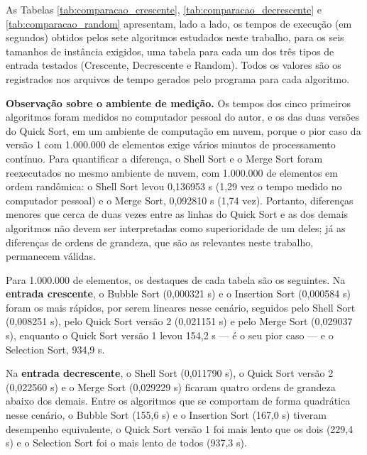 \qquad As Tabelas \ref{tab:comparacao_crescente}, \ref{tab:comparacao_decrescente}
e \ref{tab:comparacao_random} apresentam, lado a lado, os tempos de
execução (em segundos) obtidos pelos sete algoritmos estudados neste
trabalho, para os seis tamanhos de instância exigidos, uma tabela para
cada um dos três tipos de entrada testados (Crescente, Decrescente e
Random). Todos os valores são os registrados nos arquivos de tempo
gerados pelo programa para cada algoritmo.







\qquad \textbf{Observação sobre o ambiente de medição.} Os tempos dos
cinco primeiros algoritmos foram medidos no computador pessoal do
autor, e os das duas versões do Quick Sort, em um ambiente de
computação em nuvem, porque o pior caso da versão 1 com 1.000.000 de
elementos exige vários minutos de processamento contínuo. Para
quantificar a diferença, o Shell Sort e o Merge Sort foram
reexecutados no mesmo ambiente de nuvem, com 1.000.000 de elementos em
ordem randômica: o Shell Sort levou 0,136953 s (1,29 vez o tempo
medido no computador pessoal) e o Merge Sort, 0,092810 s (1,74 vez).
Portanto, diferenças menores que cerca de duas vezes entre as linhas
do Quick Sort e as dos demais algoritmos não devem ser interpretadas
como superioridade de um deles; já as diferenças de ordens de
grandeza, que são as relevantes neste trabalho, permanecem válidas.

\qquad Para 1.000.000 de elementos, os destaques de cada tabela são os
seguintes. Na \textbf{entrada crescente}, o Bubble Sort (0,000321 s) e
o Insertion Sort (0,000584 s) foram os mais rápidos, por serem
lineares nesse cenário, seguidos pelo Shell Sort (0,008251 s), pelo
Quick Sort versão 2 (0,021151 s) e pelo Merge Sort (0,029037 s),
enquanto o Quick Sort versão 1 levou 154,2 s --- é o seu pior caso ---
e o Selection Sort, 934,9 s.

\qquad Na \textbf{entrada decrescente}, o Shell Sort (0,011790 s), o
Quick Sort versão 2 (0,022560 s) e o Merge Sort (0,029229 s) ficaram
quatro ordens de grandeza abaixo dos demais. Entre os algoritmos que
se comportam de forma quadrática nesse cenário, o Bubble Sort
(155,6 s) e o Insertion Sort (167,0 s) tiveram desempenho equivalente,
o Quick Sort versão 1 foi mais lento que os dois (229,4 s) e o
Selection Sort foi o mais lento de todos (937,3 s).

